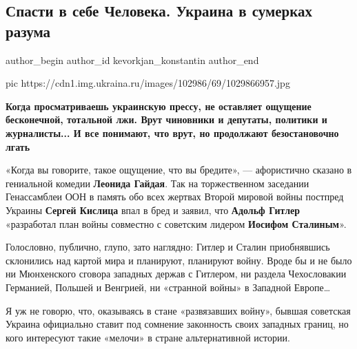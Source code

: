  
 
 
 
 
 
\subsection{Спасти в себе Человека. Украина в сумерках разума}
\label{sec:05_12_2020.news.ru.ukraina_ru.kevorkjan_konstantin.1.spasti_v_sebe_cheloveka}
\ifcmt
  author_begin
   author_id kevorkjan_konstantin
  author_end
\fi

\ifcmt
pic https://cdn1.img.ukraina.ru/images/102986/69/1029866957.jpg
\fi

\begin{leftbar}
        {\bfseries\large\color{orange}
Когда просматриваешь украинскую прессу, не оставляет ощущение бесконечной,
тотальной лжи. Врут чиновники и депутаты, политики и журналисты... И все
понимают, что врут, но продолжают безостановочно лгать
        }
\end{leftbar}

«Когда вы говорите, такое ощущение, что вы бредите», — афористично сказано в
гениальной комедии \textbf{Леонида Гайдая}. Так на торжественном заседании Генассамблеи
ООН в память обо всех жертвах Второй мировой войны постпред Украины 
\textbf{Сергей Кислица} впал в бред и заявил, что \textbf{Адольф Гитлер} «разработал план войны
совместно с советским лидером \textbf{Иосифом Сталиным}».

Голословно, публично, глупо, зато наглядно: Гитлер и Сталин приобнявшись
склонились над картой мира и планируют, планируют войну. Вроде бы и не было ни
Мюнхенского сговора западных держав с Гитлером, ни раздела Чехословакии
Германией, Польшей и Венгрией, ни «странной войны» в Западной Европе…

Я уж не говорю, что, оказываясь в стане «развязавших войну», бывшая советская
Украина официально ставит под сомнение законность своих западных границ, но
кого интересуют такие «мелочи» в стране альтернативной истории.

